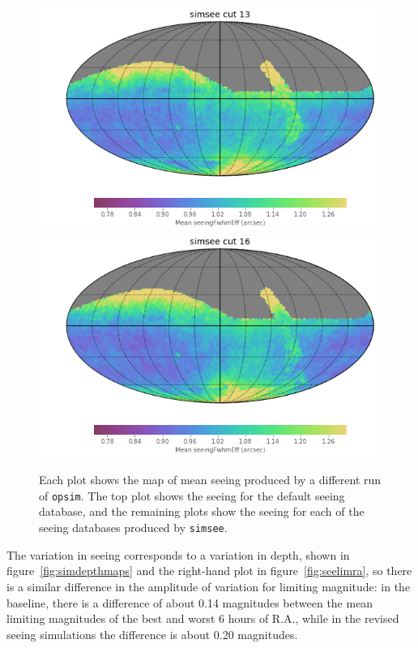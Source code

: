 \documentclass[DM,authoryear,toc]{lsstdoc}
\begin{document}
\begin{figure}
\endminipage\hfill
{}
  \includegraphics[width=\columnwidth]{./figures/seeing_map_ss58779y13_v1_3_10yrs.png}
\endminipage\hfill
{}
  \includegraphics[width=\columnwidth]{./figures/seeing_map_ss58779y16_v1_3_10yrs.png}
\endminipage\hfill
  \caption{Each plot shows the map of mean seeing
    produced by a different run of \texttt{opsim}. The top plot
    shows the seeing for the default seeing database, and the
    remaining plots show the seeing for each of the seeing databases
    produced by \texttt{simsee}.} 
  \label{fig:simseemaps}
\end{figure}

The variation in seeing corresponds to a variation in depth, shown in
figure~\ref{fig:simdepthmaps} and the right-hand plot in
figure~\ref{fig:seelimra}, so there is a
similar difference in the amplitude of variation for limiting
magnitude: in the baseline, there is a difference of about 0.14
magnitudes between the mean limiting magnitudes of the best and worst
6 hours of R.A., while in the revised seeing simulations the difference is
about 0.20 magnitudes.
\end{document}
